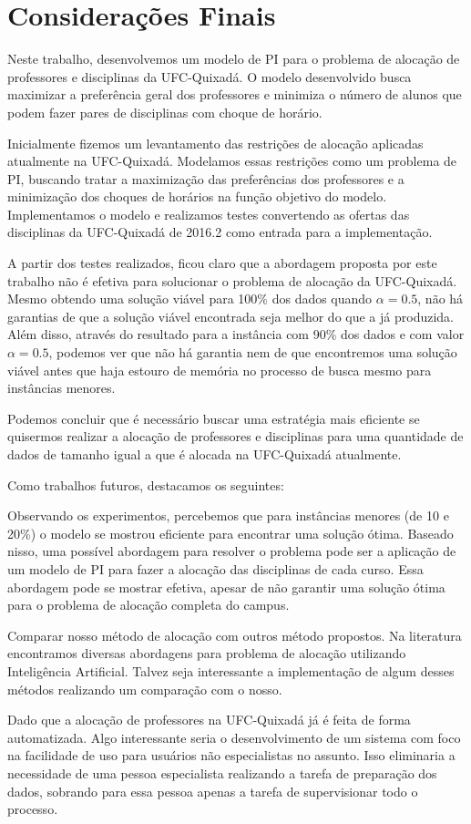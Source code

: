 \chapter{Considerações Finais}
\label{chap:consideracoes}

Neste trabalho, desenvolvemos um modelo de PI para o problema de alocação de professores e disciplinas da UFC-Quixadá. O modelo desenvolvido busca maximizar a preferência geral dos professores e minimiza o número de alunos que podem fazer pares de disciplinas com choque de horário.

Inicialmente fizemos um levantamento das restrições de alocação aplicadas atualmente na UFC-Quixadá. Modelamos essas restrições como um problema de PI, buscando tratar a maximização das preferências dos professores e a minimização dos choques de horários na função objetivo do modelo. Implementamos o modelo e realizamos testes convertendo as ofertas das disciplinas da UFC-Quixadá de 2016.2 como entrada para a implementação.

A partir dos testes realizados, ficou claro que a abordagem proposta por este trabalho não é efetiva para solucionar o problema de alocação da UFC-Quixadá. Mesmo obtendo uma solução viável para 100\% dos dados quando $\alpha = 0.5$, não há garantias de que a solução viável encontrada seja melhor do que a já produzida. Além disso, através do resultado para a instância com 90\% dos dados e com valor $\alpha = 0.5$, podemos ver que não há garantia nem de que encontremos uma solução viável antes que haja estouro de memória no processo de busca mesmo para instâncias menores.

Podemos concluir que é necessário buscar uma estratégia mais eficiente se quisermos realizar a alocação de professores e disciplinas para uma quantidade de dados de tamanho igual a que é alocada na UFC-Quixadá atualmente. 

Como trabalhos futuros, destacamos os seguintes:
\begin{alineascomponto}
\item Observando os experimentos, percebemos que para instâncias menores (de 10 e 20\%) o modelo se mostrou eficiente para encontrar uma solução ótima. Baseado nisso, uma possível abordagem para resolver o problema pode ser a aplicação de um modelo de PI para fazer a alocação das disciplinas de cada curso. Essa abordagem pode se mostrar efetiva, apesar de não garantir uma solução ótima para o problema de alocação completa do campus.
\item Comparar nosso método de alocação com outros método propostos. Na literatura encontramos diversas abordagens para problema de alocação utilizando Inteligência Artificial. Talvez seja interessante a implementação de algum desses métodos realizando um comparação com o nosso.
\item Dado que a alocação de professores na UFC-Quixadá já é feita de forma automatizada. Algo interessante seria o desenvolvimento de um sistema com foco na facilidade de uso para usuários não especialistas no assunto. Isso eliminaria a necessidade de uma pessoa especialista realizando a tarefa de preparação dos dados, sobrando para essa pessoa apenas a tarefa de supervisionar todo o processo.
\end{alineascomponto}